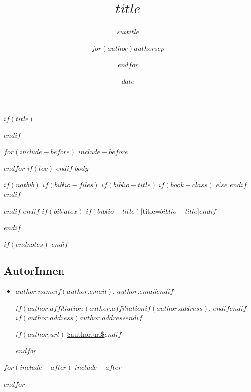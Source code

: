 \documentclass[$if(fontsize)$$fontsize$,$endif$$if(lang)$$lang$,$endif$$if(papersize)$$papersize$,$endif$$for(classoption)$$classoption$$sep$,$endfor$]{$documentclass$}
\title{$title$}
\subtitle{$subtitle$}
\author{$for(author)$$author$$sep$ \and $endfor$}
\date{$date$}
\begin{document}
$if(title)$
\maketitle
$endif$

$for(include-before)$
$include-before$

$endfor$
$if(toc)$
{
\hypersetup{linkcolor=black}
\setcounter{tocdepth}{$toc-depth$}
\tableofcontents
}
$endif$
$body$

$if(natbib)$
$if(biblio-files)$
$if(biblio-title)$
$if(book-class)$
\renewcommand\bibname{$biblio-title$}
$else$
\renewcommand\refname{$biblio-title$}
$endif$
$endif$


$endif$
$endif$
$if(biblatex)$
\printbibliography$if(biblio-title)$[title=$biblio-title$]$endif$

$endif$

$if(endnotes)$
\theendnotes
$endif$

\subsection*{AutorInnen}
\begin{itemize}
$for(author)$
\item
$author.name$$if(author.email)$, $author.email$$endif$

$if(author.affiliation)$$author.affiliation$$if(author.address)$, $endif$$endif$$if(author.address)$$author.address$$endif$

$if(author.url)$ \url{$author.url$}$endif$


$endfor$
\end{itemize}

$for(include-after)$
$include-after$

$endfor$
\end{document}
